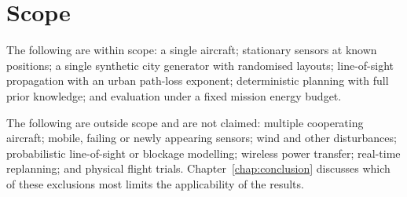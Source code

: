 \section{Scope}

The following are within scope: a single aircraft; stationary sensors at known positions; a single synthetic city generator with randomised layouts; line-of-sight propagation with an urban path-loss exponent; deterministic planning with full prior knowledge; and evaluation under a fixed mission energy budget.

The following are outside scope and are not claimed: multiple cooperating aircraft; mobile, failing or newly appearing sensors; wind and other disturbances; probabilistic line-of-sight or blockage modelling; wireless power transfer; real-time replanning; and physical flight trials. Chapter~\ref{chap:conclusion} discusses which of these exclusions most limits the applicability of the results.
